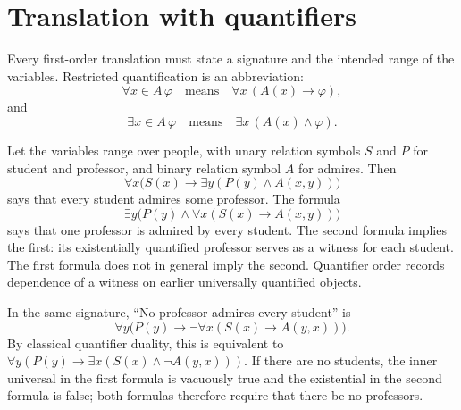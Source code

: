 \section{Translation with quantifiers}
\label{sec:fol-semantics-03}

Every first-order translation must state a signature and the intended range of
the variables.  Restricted quantification is an abbreviation:
\[
 \forall x\in A\,\varphi\quad\text{means}\quad
 \forall x\,(A(x)\to\varphi),
\]
and
\[
 \exists x\in A\,\varphi\quad\text{means}\quad
 \exists x\,(A(x)\land\varphi).
\]

\begin{example}
Let the variables range over people, with unary relation symbols
\(S\) and \(P\) for student and professor, and binary relation symbol \(A\)
for admires.  Then
\[
 \forall x\bigl(S(x)\to
   \exists y(P(y)\land A(x,y))\bigr)
\]
says that every student admires some professor.  The formula
\[
 \exists y\bigl(P(y)\land
   \forall x(S(x)\to A(x,y))\bigr)
\]
says that one professor is admired by every student.  The second formula
implies the first: its existentially quantified professor serves as a witness
for each student.  The first formula does not in general imply the second.
Quantifier order records dependence of a witness on earlier
universally quantified objects.
\end{example}

\begin{example}
In the same signature, ``No professor admires every student'' is
\[
 \forall y\bigl(P(y)\to
   \neg\forall x(S(x)\to A(y,x))\bigr).
\]
By classical quantifier duality, this is equivalent to
\(\forall y(P(y)\to\exists x(S(x)\land\neg A(y,x)))\).  If there are no
students, the inner universal in the first formula is vacuously true and the
existential in the second formula is false; both formulas therefore require
that there be no professors.
\end{example}

